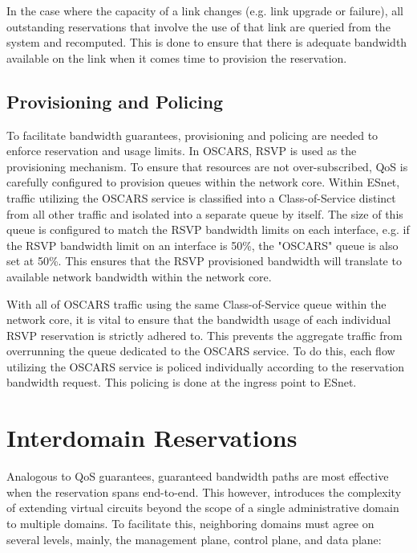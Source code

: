 \documentclass[conference]{IEEEtran}
\begin{document}
In the case where the capacity of a link changes (e.g. link upgrade or failure), all outstanding reservations
that involve the use of that link are queried from the system and recomputed.
This is done to ensure that there is adequate bandwidth available on the link when it comes time to provision the reservation.

\subsection{Provisioning and Policing}
To facilitate bandwidth guarantees, provisioning and policing are needed to 
enforce reservation and usage limits.  In OSCARS, RSVP is used as the 
provisioning mechanism.  To ensure that resources are not over-subscribed, QoS 
is carefully configured to provision queues within the network core.  Within 
ESnet, traffic utilizing the OSCARS service is classified into a 
Class-of-Service distinct from all other traffic and isolated into a separate queue by 
itself.  The size of this queue is configured to match the RSVP bandwidth 
limits on each interface, e.g. if the RSVP bandwidth limit on an interface is 
50\%, the "OSCARS" queue is also set at 50\%.  This ensures that the RSVP 
provisioned bandwidth will translate to available network bandwidth within 
the network core.

With all of OSCARS traffic using the same Class-of-Service queue within the 
network core, it is vital to ensure that the bandwidth usage of each individual 
RSVP reservation is strictly adhered to.  This prevents the aggregate traffic 
from overrunning the queue dedicated to the OSCARS service.  To do this, each 
flow utilizing the OSCARS service is policed individually according to the 
reservation bandwidth request.  This policing is done at the ingress point to 
ESnet.


\section{Interdomain Reservations}

Analogous to QoS guarantees, guaranteed bandwidth paths are most effective 
when the reservation spans end-to-end.  This however, introduces the 
complexity of extending virtual circuits beyond the scope of a 
single administrative domain to multiple domains.  To facilitate this, 
neighboring domains must agree on several levels, mainly, the management plane, 
control plane, and data plane:
\end{document}
